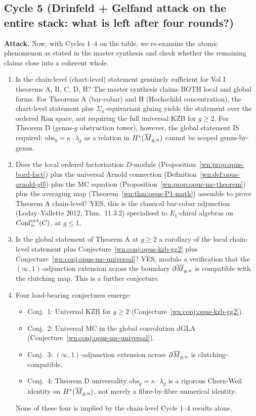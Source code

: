 \subsection*{Cycle 5 (Drinfeld + Gelfand attack on the entire stack:
what is left after four rounds?)}

\textbf{Attack.} Now, with Cycles 1--4 on the table, we re-examine the
atomic phenomenon as stated in the master synthesis and check whether
the remaining claims close into a coherent whole.

\begin{enumerate}
\item[Q17.] Is the chain-level (chart-level) statement genuinely
sufficient for Vol I theorems A, B, C, D, H? The master synthesis
claims BOTH local and global forms. For Theorems A (bar-cobar) and H
(Hochschild concentration), the chart-level statement plus
$\Sigma_n$-equivariant gluing yields the statement over the ordered Ran
space, not requiring the full universal KZB for $g \ge 2$. For Theorem
D (genus-$g$ obstruction tower), however, the global statement IS
required: $\mathrm{obs}_g = \kappa \cdot \lambda_g$ as a relation in
$H^*(\overline{M}_{g,n})$ cannot be scoped genus-by-genus.
\item[Q18.] Does the local ordered factorisation $D$-module
(Proposition~\ref{wn:prop:opus-bord-fact}) plus the universal Arnold
connection (Definition~\ref{wn:def:opus-arnold-g0}) plus the MC
equation (Proposition~\ref{wn:prop:opus-mc-theorem}) plus the averaging
map (Theorem~\ref{wn:thm:opus-P1-math}) assemble to prove Theorem A
chain-level? YES, this is the classical bar-cobar adjunction
(Loday--Vallette 2012, Thm.\ 11.3.2) specialised to $E_1$-chiral
algebras on $\mathrm{Conf}_n^{\mathrm{ord}}(C)$, at $g \le 1$.
\item[Q19.] Is the global statement of Theorem A at $g \ge 2$ a
corollary of the local chain-level statement plus Conjecture~\ref{wn:conj:opus-kzb-gg2}
plus Conjecture~\ref{wn:conj:opus-mc-universal}? YES, modulo a
verification that the $(\infty,1)$-adjunction extension across the
boundary $\partial \overline{M}_{g,n}$ is compatible with the clutching
map. This is a further conjecture.
\item[Q20.] Four load-bearing conjectures emerge:
\begin{itemize}
\item Conj.\ 1: Universal KZB for $g \ge 2$
(Conjecture~\ref{wn:conj:opus-kzb-gg2}).
\item Conj.\ 2: Universal MC in the global convolution dGLA
(Conjecture~\ref{wn:conj:opus-mc-universal}).
\item Conj.\ 3: $(\infty,1)$-adjunction extension across
$\partial \overline{M}_{g,n}$ is clutching-compatible.
\item Conj.\ 4: Theorem D universality $\mathrm{obs}_g = \kappa \cdot
\lambda_g$ is a rigorous Chern-Weil identity on
$H^*(\overline{M}_{g,n})$, not merely a fibre-by-fibre numerical identity.
\end{itemize}
None of these four is implied by the chain-level Cycle 1--4 results
alone.
\end{enumerate}

